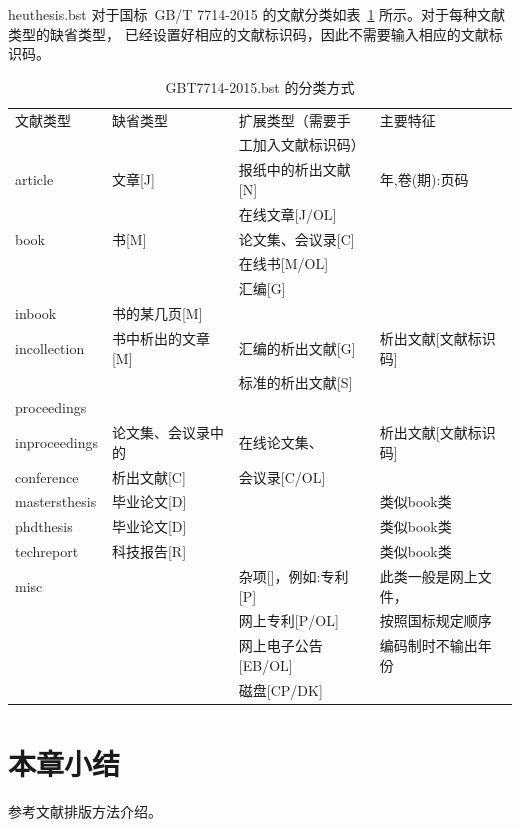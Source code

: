 heuthesis.bst 对于国标~GB/T 7714-2015 的文献分类如表~\ref{tab:entrytypes} 所示。对于每种文献类型的缺省类型，
已经设置好相应的文献标识码，因此不需要输入相应的文献标识码。

\begin{table}[htbp]
  \caption{GBT7714-2015.bst 的分类方式}
  \label{tab:entrytypes}
  \vspace{0.5em}\centering\wuhao
  \begin{tabular}{llll}
    \toprule[1.5pt]
    文献类型      & 缺省类型           & 扩展类型（需要手     & 主要特征             \\
                  &                    & 工加入文献标识码）   &                      \\
    \midrule[1pt]
    article       & 文章[J]            & 报纸中的析出文献[N]  & 年,卷(期):页码       \\
                  &                    & 在线文章[J/OL]       &                      \\
    book          & 书[M]              & 论文集、会议录[C]    &                      \\
                  &                    & 在线书[M/OL]         &                      \\
                  &                    & 汇编[G]              &                      \\
    inbook        & 书的某几页[M]      &                      &                      \\
    incollection  & 书中析出的文章[M]  & 汇编的析出文献[G]    & 析出文献[文献标识码] \\
                  &                    & 标准的析出文献[S]    &                      \\
    proceedings   &                    &                      &                      \\
    inproceedings & 论文集、会议录中的 & 在线论文集、         & 析出文献[文献标识码] \\
    conference    & 析出文献[C]        & 会议录[C/OL]         &                      \\
    mastersthesis & 毕业论文[D]        &                      & 类似book类           \\
    phdthesis     & 毕业论文[D]        &                      & 类似book类           \\
    techreport    & 科技报告[R]        &                      & 类似book类           \\
    misc          &                    & 杂项[]，例如:专利[P] & 此类一般是网上文件， \\
                  &                    & 网上专利[P/OL]       & 按照国标规定顺序     \\
                  &                    & 网上电子公告[EB/OL]  & 编码制时不输出年份   \\
                  &                    & 磁盘[CP/DK]          &                      \\
    \bottomrule[1.5pt]
  \end{tabular}
\end{table}

\section{本章小结}
参考文献排版方法介绍。
